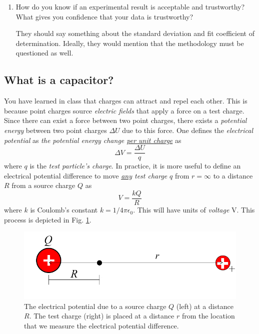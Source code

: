 \documentclass[12pt]{report}
\begin{document}
\begin{enumerate}
\begin{tcolorbox}[title=Answer]
\end{tcolorbox}
\item How do you know if an experimental result is acceptable and trustworthy? What gives you confidence that your data is trustworthy?
\begin{tcolorbox}[title=Answer]
They should say something about the standard deviation and fit coefficient of determination. Ideally, they would mention that the methodology must be questioned as well.
\end{tcolorbox}
\end{enumerate}

\subsection{What is a capacitor?}
You have learned in class that charges can attract and repel each other. This is because point charges source \textit{electric fields} that apply a force on a test charge. Since there can exist a force between two point charges, there exists a \textit{potential energy} between two point charges $\Delta U$ due to this force. One defines the \textit{electrical potential} as \textit{the potential energy change \underline{per unit charge}} as
\begin{equation}
\Delta V = \frac{\Delta U}{q}
\label{Eq:ElectricPotential}
\end{equation}
where $q$ is the \textit{test particle's charge}. In practice, it is more useful to define an electrical potential difference to move \textit{\underline{any} test charge} $q$ from $r=\infty$ to a distance $R$ from a source charge $Q$ as
\begin{equation}
V = \frac{k Q}{R}
\label{Eq:ElectricPotential_point}
\end{equation}
where $k$ is Coulomb's constant $k = {1}/{4\pi \epsilon_0}$. This will have units of \textit{voltage} V. This process is depicted in Fig. \ref{Fig:ElectricPotential_point}.
\begin{figure}[h]
\centering
\includegraphics[width=0.7 \textwidth]{lab1-electric-potential.png}
\caption{The electrical potential due to a source charge $Q$ (left) at a distance $R$. The test charge (right) is placed at a distance $r$ from the location that we measure the electrical potential difference.}
\label{Fig:ElectricPotential_point}
\end{figure}
\end{document}
